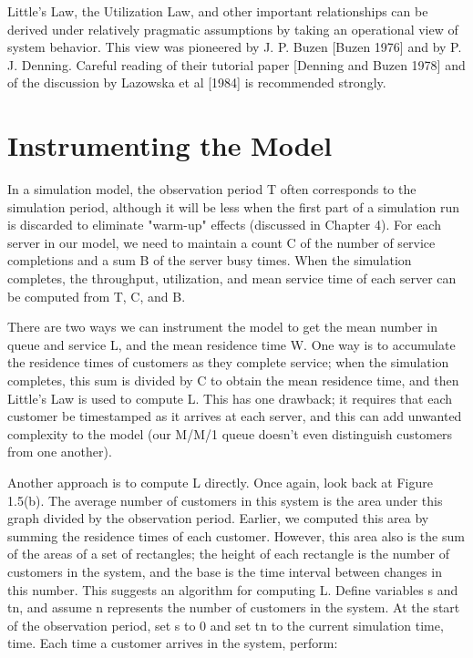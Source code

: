 Little's Law, the Utilization Law, and other important relationships can be
derived under relatively pragmatic assumptions by taking an operational view of
system behavior. This view was pioneered by J. P. Buzen [Buzen 1976] and by
P. J. Denning. Careful reading of their tutorial paper [Denning and Buzen 1978]
and of the discussion by Lazowska et al [1984] is recommended strongly.

\section{Instrumenting the Model}
\label{sec:instrumenting-the-model}

In a simulation model, the observation period T often corresponds to the
simulation period, although it will be less when the first part of a simulation
run is discarded to eliminate "warm-up" effects (discussed in Chapter 4). For
each server in our model, we need to maintain a count C of the number of
service completions and a sum B of the server busy times. When the simulation
completes, the throughput, utilization, and mean service time of each server
can be computed from T, C, and B.

There are two ways we can instrument the model to get the mean number in queue
and service L, and the mean residence time W. One way is to accumulate the
residence times of customers as they complete service; when the simulation
completes, this sum is divided by C to obtain the mean residence time, and then
Little's Law is used to compute L. This has one drawback; it requires that each
customer be timestamped as it arrives at each server, and this can add unwanted
complexity to the model (our M/M/1 queue doesn't even distinguish customers
from one another).

Another approach is to compute L directly. Once again, look back at Figure
1.5(b). The average number of customers in this system is the area under this
graph divided by the observation period. Earlier, we computed this area by
summing the residence times of each customer. However, this area also is the
sum of the areas of a set of rectangles; the height of each rectangle is the
number of customers in the system, and the base is the time interval between
changes in this number. This suggests an algorithm for computing L. Define
variables s and tn, and assume n represents the number of customers in the
system. At the start of the observation period, set s to 0 and set tn to the
current simulation time, time. Each time a customer arrives in the system,
perform:

